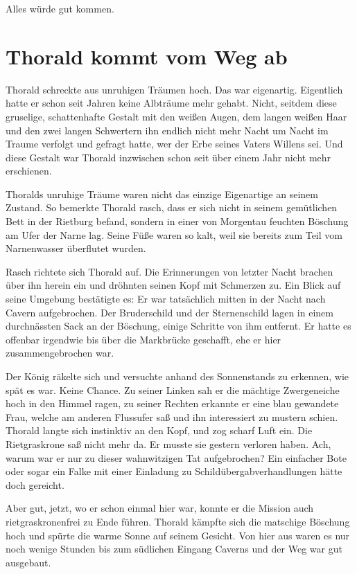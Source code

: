 Alles würde gut kommen.








\newpage
\section{Thorald kommt vom Weg ab}


Thorald schreckte aus unruhigen Träumen hoch. Das war eigenartig. Eigentlich hatte er schon seit Jahren keine Albträume mehr gehabt. Nicht, seitdem diese gruselige, schattenhafte Gestalt mit den weißen Augen, dem langen weißen Haar und den zwei langen Schwertern ihn endlich nicht mehr Nacht um Nacht im Traume verfolgt und gefragt hatte, wer der Erbe seines Vaters Willens sei. Und diese Gestalt war Thorald inzwischen schon seit über einem Jahr nicht mehr erschienen.

Thoralds unruhige Träume waren nicht das einzige Eigenartige an seinem Zustand. So bemerkte Thorald rasch, dass er sich nicht in seinem gemütlichen Bett in der Rietburg befand, sondern in einer von Morgentau feuchten Böschung am Ufer der Narne lag. Seine Füße waren so kalt, weil sie bereits zum Teil vom Narnenwasser überflutet wurden.

Rasch richtete sich Thorald auf. Die Erinnerungen von letzter Nacht brachen über ihn herein ein und dröhnten seinen Kopf mit Schmerzen zu. Ein Blick auf seine Umgebung bestätigte es: Er war tatsächlich mitten in der Nacht nach Cavern aufgebrochen. Der Bruderschild und der Sternenschild lagen in einem durchnässten Sack an der Böschung, einige Schritte von ihm entfernt. Er hatte es offenbar irgendwie bis über die Markbrücke geschafft, ehe er hier zusammengebrochen war.

Der König räkelte sich und versuchte anhand des Sonnenstands zu erkennen, wie spät es war. Keine Chance. Zu seiner Linken sah er die mächtige Zwergeneiche hoch in den Himmel ragen, zu seiner Rechten erkannte er eine blau gewandete Frau, welche am anderen Flussufer saß und ihn interessiert zu mustern schien. Thorald langte sich instinktiv an den Kopf, und zog scharf Luft ein. Die Rietgraskrone saß nicht mehr da. Er musste sie gestern verloren haben. Ach, warum war er nur zu dieser wahnwitzigen Tat aufgebrochen? Ein einfacher Bote oder sogar ein Falke mit einer Einladung zu Schildübergabverhandlungen hätte doch gereicht.

Aber gut, jetzt, wo er schon einmal hier war, konnte er die Mission auch rietgraskronenfrei zu Ende führen. Thorald kämpfte sich die matschige Böschung hoch und spürte die warme Sonne auf seinem Gesicht. Von hier aus waren es nur noch wenige Stunden bis zum südlichen Eingang Caverns und der Weg war gut ausgebaut.

